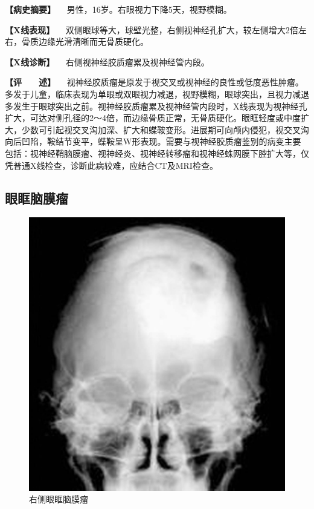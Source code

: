 \textbf{【病史摘要】} 　男性，16岁。右眼视力下降5天，视野模糊。

\textbf{【X线表现】}
　双侧眼球等大，球壁光整，右侧视神经孔扩大，较左侧增大2倍左右，骨质边缘光滑清晰而无骨质硬化。

\textbf{【X线诊断】} 　右侧视神经胶质瘤累及视神经管内段。

\textbf{【评　　述】}
　视神经胶质瘤是原发于视交叉或视神经的良性或低度恶性肿瘤。多发于儿童，临床表现为单眼或双眼视力减退，视野模糊，眼球突出，且视力减退多发生于眼球突出之前。视神经胶质瘤累及视神经管内段时，X线表现为视神经孔扩大，可达对侧孔径的2～4倍，而边缘骨质正常，无骨质硬化。眼眶轻度或中度扩大，少数可引起视交叉沟加深、扩大和蝶鞍变形。进展期可向颅内侵犯，视交叉沟向后凹陷，鞍结节变平，蝶鞍呈W形表现。需要与视神经胶质瘤鉴别的病变主要包括：视神经鞘脑膜瘤、视神经炎、视神经转移瘤和视神经蛛网膜下腔扩大等，仅凭普通X线检查，诊断此病较难，应结合CT及MRI检查。

\subsection{眼眶脑膜瘤}

\begin{figure}[!htbp]
 \centering
 \includegraphics{./images/Image00419.jpg}
 \captionsetup{justification=centering}
 \caption{右侧眼眶脑膜瘤}
 \label{fig7-2-3}
  \end{figure} 

